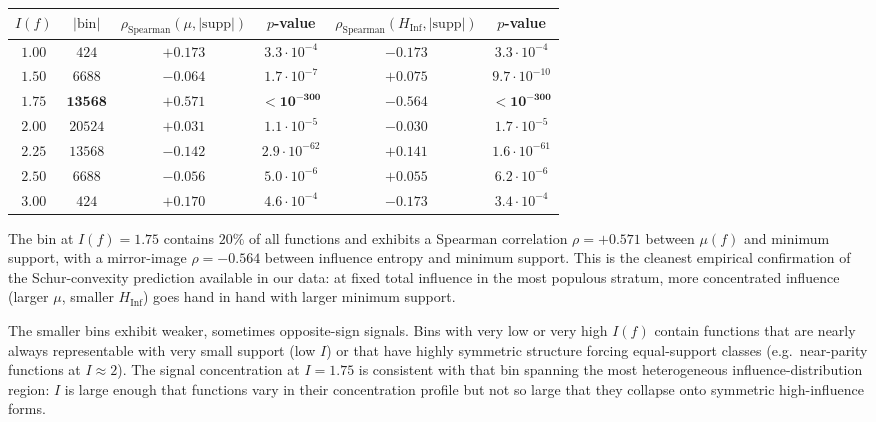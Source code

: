 \documentclass[11pt]{article}
\newcommand{\Inf}{\mathrm{Inf}}
\newcommand{\supp}{\mathrm{supp}}
\begin{document}
\begin{center}
\small
\begin{tabular}{cccccc}
\toprule
$I(f)$ & $|\text{bin}|$ & $\rho_{\text{Spearman}}(\mu, |\supp|)$ & $p$-value & $\rho_{\text{Spearman}}(H_{\Inf}, |\supp|)$ & $p$-value \\
\midrule
$1.00$ & $424$ & $+0.173$ & $3.3{\cdot}10^{-4}$ & $-0.173$ & $3.3{\cdot}10^{-4}$ \\
$1.50$ & $6688$ & $-0.064$ & $1.7{\cdot}10^{-7}$ & $+0.075$ & $9.7{\cdot}10^{-10}$ \\
$\mathbf{1.75}$ & $\mathbf{13568}$ & $\mathbf{+0.571}$ & $\mathbf{<10^{-300}}$ & $\mathbf{-0.564}$ & $\mathbf{<10^{-300}}$ \\
$2.00$ & $20524$ & $+0.031$ & $1.1{\cdot}10^{-5}$ & $-0.030$ & $1.7{\cdot}10^{-5}$ \\
$2.25$ & $13568$ & $-0.142$ & $2.9{\cdot}10^{-62}$ & $+0.141$ & $1.6{\cdot}10^{-61}$ \\
$2.50$ & $6688$ & $-0.056$ & $5.0{\cdot}10^{-6}$ & $+0.055$ & $6.2{\cdot}10^{-6}$ \\
$3.00$ & $424$ & $+0.170$ & $4.6{\cdot}10^{-4}$ & $-0.173$ & $3.4{\cdot}10^{-4}$ \\
\bottomrule
\end{tabular}
\end{center}

The bin at $I(f) = 1.75$ contains $20\%$ of all functions and exhibits a Spearman correlation $\rho = +0.571$ between $\mu(f)$ and minimum support, with a mirror-image $\rho = -0.564$ between influence entropy and minimum support. This is the cleanest empirical confirmation of the Schur-convexity prediction available in our data: at fixed total influence in the most populous stratum, more concentrated influence (larger $\mu$, smaller $H_{\Inf}$) goes hand in hand with larger minimum support.

The smaller bins exhibit weaker, sometimes opposite-sign signals. Bins with very low or very high $I(f)$ contain functions that are nearly always representable with very small support (low $I$) or that have highly symmetric structure forcing equal-support classes (e.g.\ near-parity functions at $I \approx 2$). The signal concentration at $I = 1.75$ is consistent with that bin spanning the most heterogeneous influence-distribution region: $I$ is large enough that functions vary in their concentration profile but not so large that they collapse onto symmetric high-influence forms.
\end{document}
